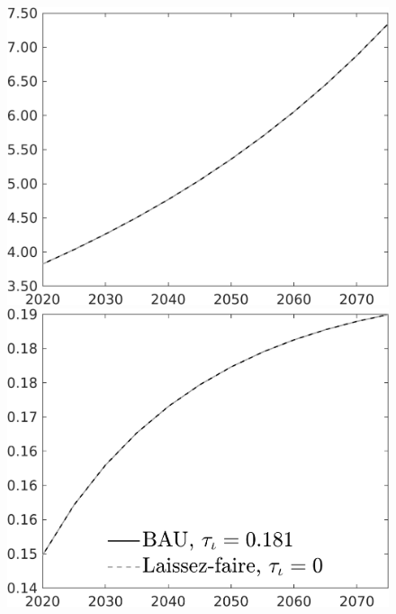 \documentclass[12pt]{article}
\begin{document}
\begin{figure}[h!!]
\begin{minipage}[]{0.32\textwidth}
	\end{minipage}	
	\begin{minipage}[]{0.32\textwidth}
		\includegraphics[width=1\textwidth]{../../codding_model/own_basedOnFried/optimalPol_010922_revision/figures/all_13Sept22/CompTaul_LFBAU_Reg0_wh_spillover0_nsk1_xgr1_knspil0_sep1_countec0_GovRev0_etaa0.79_lgd0.png}
	\end{minipage}	
	\begin{minipage}[]{0.32\textwidth}
		\includegraphics[width=1\textwidth]{../../codding_model/own_basedOnFried/optimalPol_010922_revision/figures/all_13Sept22/CompTaul_LFBAU_Reg0_GFF_spillover0_nsk1_xgr1_knspil0_sep1_countec0_GovRev0_etaa0.79_lgd1.png}

\end{minipage}
\end{figure}
\end{document}
